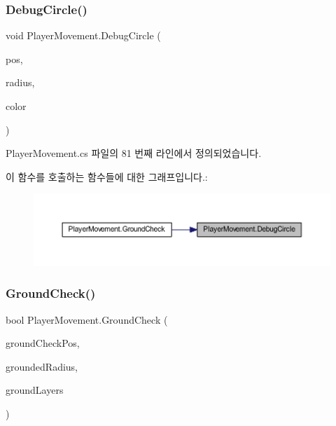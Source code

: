 \subsubsection{\texorpdfstring{DebugCircle()}{DebugCircle()}}
{\footnotesize\ttfamily void Player\+Movement.\+Debug\+Circle (\begin{DoxyParamCaption}\item[{Vector3}]{pos,  }\item[{float}]{radius,  }\item[{Color}]{color }\end{DoxyParamCaption})\hspace{0.3cm}{\ttfamily [private]}}



Player\+Movement.\+cs 파일의 81 번째 라인에서 정의되었습니다.


\begin{DoxyCode}{0}

\end{DoxyCode}
이 함수를 호출하는 함수들에 대한 그래프입니다.\+:\nopagebreak
\begin{figure}[H]
\begin{center}
\leavevmode
\includegraphics[width=350pt]{d0/d3d/class_player_movement_a6f77ea4796901d5e2a476e2f8ec49b51_icgraph}
\end{center}
\end{figure}
\mbox{\label{class_player_movement_a957f2e09268831052dbd00a9e8e4fa70}} 
\subsubsection{\texorpdfstring{GroundCheck()}{GroundCheck()}}
{\footnotesize\ttfamily bool Player\+Movement.\+Ground\+Check (\begin{DoxyParamCaption}\item[{Vector2}]{ground\+Check\+Pos,  }\item[{float}]{grounded\+Radius,  }\item[{Layer\+Mask}]{ground\+Layers }\end{DoxyParamCaption})}



